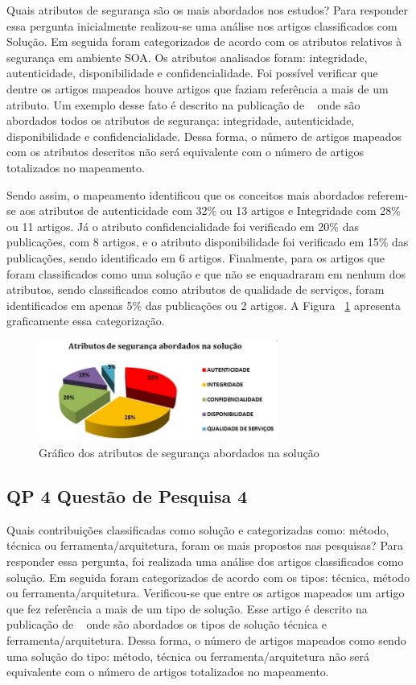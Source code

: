 Quais atributos de segurança são os mais abordados nos estudos?
Para responder essa pergunta inicialmente realizou-se uma análise nos artigos classificados com Solução. Em seguida foram categorizados de acordo com os atributos relativos à segurança em ambiente SOA. Os atributos analisados foram: integridade, autenticidade, disponibilidade e confidencialidade. Foi possível verificar que dentre os artigos mapeados houve artigos que faziam referência a mais de um atributo.  Um exemplo desse fato é descrito na publicação de ~\cite{pattern-driven2008} onde são abordados todos os atributos de segurança: integridade, autenticidade, disponibilidade e confidencialidade. Dessa forma, o número de artigos mapeados com os atributos descritos não será equivalente com o número de artigos totalizados no mapeamento.

Sendo assim, o mapeamento identificou que os conceitos mais abordados referem-se aos atributos de autenticidade com 32\% ou 13 artigos e Integridade com 28\% ou 11 artigos. Já o atributo confidencialidade foi verificado em 20\% das publicações, com 8 artigos, e o atributo disponibilidade foi verificado em 15\% das publicações, sendo identificado em 6 artigos. Finalmente, para os artigos que foram classificados como uma solução e que não se enquadraram em nenhum dos atributos, sendo classificados como atributos de qualidade de serviços, foram identificados em apenas 5\% das publicações ou 2 artigos. A Figura ~\ref{fig:TipoConceito} apresenta graficamente essa categorização.

\begin{figure}[!htb]
\centering
\includegraphics[width=0.7\textwidth]{Atributo_Seguranca_Solucao.jpg}
\caption{Gráfico dos atributos de segurança abordados na solução}
\label{fig:TipoConceito}
\end{figure}

\subsection{QP 4 \- Questão de Pesquisa 4}

Quais contribuições classificadas como solução e categorizadas como: método, técnica ou ferramenta/arquitetura, foram os mais propostos nas pesquisas?
Para responder essa pergunta, foi realizada uma análise dos artigos classificados como solução. Em seguida foram categorizados de acordo com os tipos: técnica, método ou ferramenta/arquitetura. Verificou-se que entre os artigos mapeados um artigo que fez referência a mais de um tipo de solução.  Esse artigo é descrito na publicação de ~\cite{CrossRealmSOA2012} onde são abordados os tipos de solução técnica e ferramenta/arquitetura. Dessa forma, o número de artigos mapeados como sendo uma solução do tipo: método, técnica ou ferramenta/arquitetura não será equivalente com o número de artigos totalizados no mapeamento.

